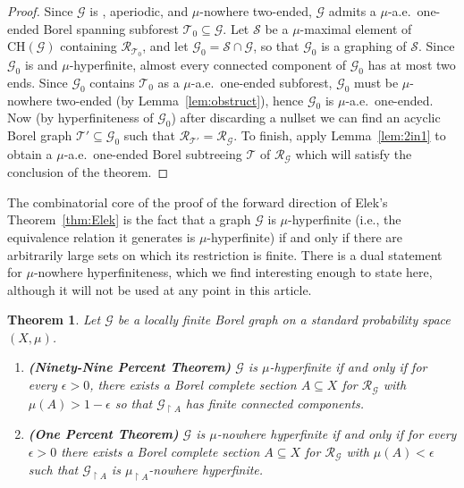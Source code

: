 \documentclass[11pt]{amsart}
\theoremstyle{definition}
\theoremstyle{plain}
\newtheorem{theorem}[definition]{Theorem}
\newcommand{\<}{\langle}
\renewcommand{\>}{\rangle}
\newcommand{\Ggraph}{\mathcal{G}}
\newcommand{\Tgraph}{\mathcal{T}}
\newcommand{\pmp}{\text{p.m.p.}}
\newcommand\RR{\mathscr{R}}
\begin{document}
\begin{proof}
Since $\Ggraph$ is \pmp{}, aperiodic, and $\mu$-nowhere two-ended,
$\Ggraph$ admits a $\mu$-a.e.\ one-ended Borel spanning subforest
$\Tgraph_0\subseteq \Ggraph$. Let $\mathcal{S}$ be a $\mu$-maximal
element of $\mathrm{CH}(\Ggraph)$ containing $\RR_{\Tgraph_0}$,
and let $\Ggraph_0= \mathcal{S}\cap \Ggraph$, so that $\Ggraph_0$ is a
graphing of $\mathcal{S}$. Since $\Ggraph_0$ is \pmp{} and
$\mu$-hyperfinite, almost every connected component of $\Ggraph_0$ has at
most two ends. Since $\Ggraph_0$ contains $\Tgraph_0$ as a $\mu$-a.e.\
one-ended subforest, $\Ggraph_0$ must be $\mu$-nowhere two-ended (by Lemma~\ref{lem:obstruct}), hence
$\Ggraph_0$ is $\mu$-a.e.\ one-ended. Now (by hyperfiniteness of $\Ggraph_0$)
 after discarding a nullset we can find an acyclic Borel graph
$\Tgraph' \subseteq \Ggraph_0$ such that $\RR_{\Tgraph'} =
\RR_\Ggraph$. To finish, apply Lemma~\ref{lem:2in1} to obtain a
$\mu$-a.e.\ one-ended Borel subtreeing $\Tgraph$ of
$\RR_\Ggraph$ which will satisfy the conclusion of the theorem.
\end{proof}

The combinatorial core of the proof of the forward direction of Elek's Theorem~\ref{thm:Elek} is the fact that a
graph $\Ggraph$ is $\mu$-hyperfinite (i.e., the equivalence relation it generates is $\mu$-hyperfinite) if and only if there are arbitrarily
large sets on which its restriction is finite. There is a dual
statement for $\mu$-nowhere hyperfiniteness, which we find interesting enough to state here, although it will not be used at any point in this article.




\begin{theorem} \label{thm:1percent}
Let $\Ggraph$ be a \pmp{} locally finite Borel graph on a standard
probability space $(X,\mu )$.
\begin{enumerate}


\item \textbf {(Ninety-Nine Percent Theorem)}
  $\Ggraph$ is $\mu$-hyperfinite if and only if for
every $\epsilon > 0$, there exists a Borel complete section $A \subseteq X$ for
$\RR_\Ggraph$ with $\mu(A) > 1 - \epsilon$ so that $\Ggraph_{\restriction A}$ has
finite connected components.
  
    \item  \textbf{(One Percent Theorem)} $\Ggraph$ is $\mu$-nowhere hyperfinite if and only if for every
  $\epsilon >0$ there exists a Borel complete section $A\subseteq X$ for
  $\RR_{\Ggraph}$ with $\mu (A)<\epsilon$ such that $\Ggraph_{\restriction A}$ is $\mu _{\restriction A}$-nowhere hyperfinite.
  \end{enumerate}
\end{theorem}
\end{document}
